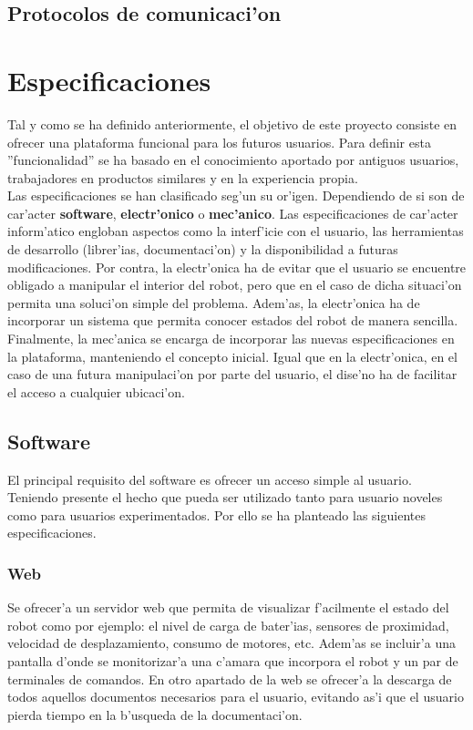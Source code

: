 \documentclass[twoside,12pt]{article}
\begin{document}
\subsection{Protocolos de comunicaci'on}

\section{Especificaciones}
Tal y como se ha definido anteriormente, el objetivo de este proyecto consiste en ofrecer una plataforma funcional para los futuros usuarios. Para definir esta ''funcionalidad'' se ha basado en el conocimiento aportado por antiguos usuarios, trabajadores en productos similares y en la experiencia propia. \\

Las especificaciones se han clasificado seg'un su or'igen. Dependiendo de si son de car'acter \textbf{software}, \textbf{electr'onico} o \textbf{mec'anico}. Las especificaciones de car'acter inform'atico engloban aspectos como la interf'icie con el usuario, las herramientas de desarrollo (librer'ias, documentaci'on) y la disponibilidad a futuras modificaciones. Por contra, la electr'onica ha de evitar que el usuario se encuentre obligado a manipular el interior del robot, pero que en el caso de dicha situaci'on permita una soluci'on simple del problema. Adem'as, la electr'onica ha de incorporar un sistema que permita conocer estados del robot de manera sencilla. Finalmente, la mec'anica se encarga de incorporar las nuevas especificaciones en la plataforma, manteniendo el concepto inicial. Igual que en la electr'onica, en el caso de una futura manipulaci'on por parte del usuario, el dise'no ha de facilitar el acceso a cualquier ubicaci'on.

\subsection{Software}
El principal requisito del software es ofrecer un acceso simple al usuario. Teniendo presente el hecho que pueda ser utilizado tanto para usuario noveles como para usuarios experimentados. Por ello se ha planteado las siguientes especificaciones.

\subsubsection{Web}
Se ofrecer'a un servidor web que permita de visualizar f'acilmente el estado del robot como por ejemplo: el nivel de carga de bater'ias, sensores de proximidad, velocidad de desplazamiento, consumo de motores, etc. Adem'as se incluir'a una pantalla d'onde se monitorizar'a una c'amara que incorpora el robot y un par de terminales de comandos.
En otro apartado de la web se ofrecer'a la descarga de todos aquellos documentos necesarios para el usuario, evitando as'i que el usuario pierda tiempo en la b'usqueda de la documentaci'on.
\end{document}

